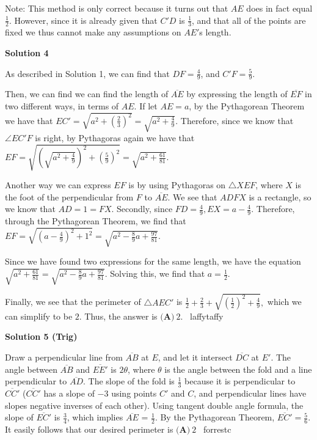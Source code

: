 \begin{enumerate}
 Note: This method is only correct because it turns out that $AE$ does in fact equal $\frac{1}{2}$. However, since it is already given that $C'D$ is $\frac{1}{3}$, and that all of the points are fixed we thus cannot make any assumptions on $AE'$s length. 

 



\textbf{Solution 4}

As described in Solution 1, we can find that $DF=\frac{4}{9}$, and $C'F = \frac{5}{9}.$ 

 
Then, we can find we can find the length of $\overline{AE}$ by expressing the length of $\overline{EF}$ in two different ways, in terms of $AE$. If let $AE = a$, by the Pythagorean Theorem we have that $EC' = \sqrt{a^2 + \left(\frac{2}{3}\right)^2} = \sqrt{a^2 + \frac{4}{9}}.$ Therefore, since we know that $\angle EC'F$ is right, by Pythagoras again we have that $EF = \sqrt{\left(\sqrt{a^2+\frac{4}{9}}\right)^2 + \left(\frac{5}{9}\right)^2} = \sqrt{a^2 + \frac{61}{81}}.$

 
Another way we can express $EF$ is by using Pythagoras on $\triangle XEF$, where $X$ is the foot of the perpendicular from $F$ to $\overline{AE}.$ We see that $ADFX$ is a rectangle, so we know that $AD = 1 = FX$. Secondly, since $FD = \frac{4}{9}, EX = a - \frac{4}{9}$. Therefore, through the Pythagorean Theorem, we find that $EF = \sqrt{\left(a-\frac{4}{9}\right)^2 + 1^2} = \sqrt{a^2 - \frac{8}{9}a +\frac{97}{81}}.$

 Since we have found two expressions for the same length, we have the equation $\sqrt{a^2 + \frac{61}{81}} = \sqrt{a^2 - \frac{8}{9}a +\frac{97}{81}}.$ Solving this, we find that $a=\frac{1}{2}$.

 Finally, we see that the perimeter of $\triangle AEC'$ is $\frac{1}{2} + \frac{2}{3} + \sqrt{\left(\frac{1}{2}\right)^2 + \frac{4}{9}},$ which we can simplify to be $2$. Thus, the answer is $\boxed{\textbf{(A)} ~2}.$ ~laffytaffy

 



\textbf{Solution 5 (Trig)}

Draw a perpendicular line from $\overline{AB}$ at $E$, and let it intersect $\overline{DC}$ at $E'$. The angle between $\overline{AB}$ and $\overline{EE'}$ is $2\theta$, where $\theta$ is the angle between the fold and a line perpendicular to $\overline{AD}$. The slope of the fold is $\frac{1}{3}$ because it is perpendicular to $\overline{CC'}$ ($\overline{CC'}$ has a slope of $-3$ using points $C'$ and $C$, and perpendicular lines have slopes negative inverses of each other). Using tangent double angle formula, the slope of $\overline{EC'}$ is $\frac{3}{4}$, which implies $\overline{AE}$ = $\frac{1}{2}$. By the Pythagorean Theorem, $\overline{EC'}=\frac{5}{6}$. It easily follows that our desired perimeter is $\boxed{\textbf{(A)} ~2}$ ~forrestc


\end{enumerate}
